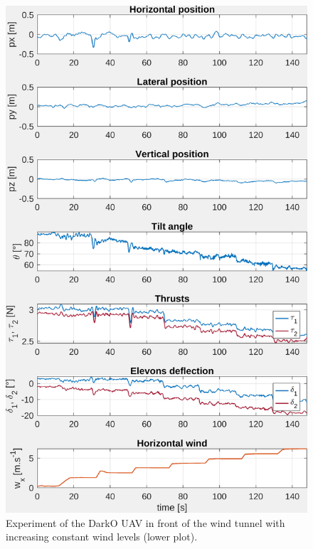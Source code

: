\begin{figure}[ht]
    \centering
    \includegraphics[trim=0cm 0cm 0cm 0cm,clip,width=0.9\columnwidth]{figures/exp_systune_struct.png}
    \caption{Experiment of the DarkO UAV in front of the wind tunnel with increasing constant wind levels (lower plot).}
    \label{fig:ExpSytuneStruct}
\end{figure}

